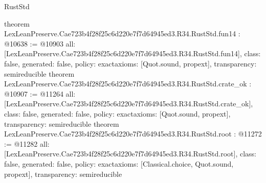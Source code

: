 \begin{lexlean}{RustStd}
\begin{coremodule}
{}
theorem LexLeanPreserve.Cae723b4f28f25c6d220e7f7d64945ed3.R34.RustStd.fun14 : @10638 := @10903 {
  all: [LexLeanPreserve.Cae723b4f28f25c6d220e7f7d64945ed3.R34.RustStd.fun14],
  class: false,
  generated: false,
  policy: exact{axioms: [Quot.sound, propext]},
  transparency: semireducible
}
theorem LexLeanPreserve.Cae723b4f28f25c6d220e7f7d64945ed3.R34.RustStd.crate_ok : @10907 := @11264 {
  all: [LexLeanPreserve.Cae723b4f28f25c6d220e7f7d64945ed3.R34.RustStd.crate_ok],
  class: false,
  generated: false,
  policy: exact{axioms: [Quot.sound, propext]},
  transparency: semireducible
}
theorem LexLeanPreserve.Cae723b4f28f25c6d220e7f7d64945ed3.R34.RustStd.root : @11272 := @11282 {
  all: [LexLeanPreserve.Cae723b4f28f25c6d220e7f7d64945ed3.R34.RustStd.root],
  class: false,
  generated: false,
  policy: exact{axioms: [Classical.choice, Quot.sound, propext]},
  transparency: semireducible
}


\end{coremodule}
\end{lexlean}
